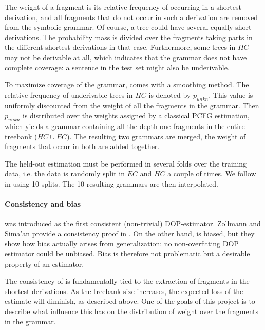 The weight of a fragment is its relative frequency of occurring in a shortest derivation, and all fragments that do not occur in such a derivation are removed from the symbolic grammar. 
Of course, a tree could have several equally short derivations. The probability mass is divided over the fragments taking parts in the different shortest derivations in that case. Furthermore, some trees in $HC$ may not be derivable at all, which indicates that the grammar does not have complete coverage: a sentence in the test set might also be underivable. 

To maximize coverage of the grammar, \dops{} comes with a smoothing method. The relative frequency of underivable trees in $HC$ is denoted by $p_{unkn}$. This value is uniformly discounted from the weight of all the fragments in the grammar. Then $p_{unkn}$ is distributed over the weights assigned by a classical PCFG estimation, which yields a grammar containing all the depth one fragments in the entire treebank ($HC\cup EC$). The resulting two grammars are merged, the weight of fragments that occur in both are added together.

The held-out estimation must be performed in several folds over the training data, i.e. the data is randomly split in $EC$ and $HC$ a couple of times. We follow \cite{zollmann2005} in using 10 splits. The 10 resulting grammars are then interpolated.

\paragraph{Consistency and bias}
\dops{} was introduced as the first consistent (non-trivial) DOP-estimator. Zollmann and Sima'an provide a consistency proof in . On the other hand, \dops{} is  biased, but they show how bias actually arises from generalization: no non-overfitting DOP estimator could be unbiased. Bias is therefore not problematic but a desirable property of an estimator.

The consistency of \dops{} is fundamentally tied to the extraction of fragments in the shortest derivations. As the treebank size increases, the expected loss of the estimate will diminish, as described above. One of the goals of this project is to describe what influence this has on the distribution of weight over the fragments in the grammar.

